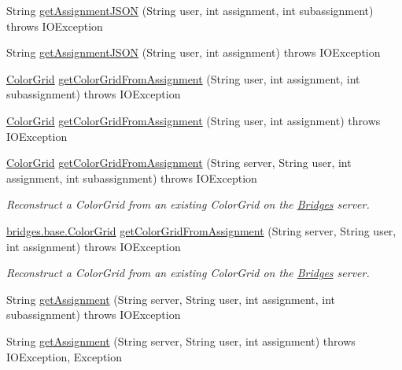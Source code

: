 \begin{DoxyCompactItemize}
String \hyperlink{classbridges_1_1connect_1_1_data_source_af2f6cd7172acb64b2ba49f134b5391f8}{get\+Assignment\+J\+S\+ON} (String user, int assignment, int subassignment)  throws I\+O\+Exception 
\item 
String \hyperlink{classbridges_1_1connect_1_1_data_source_af55c85da71b588f64ff4b46dbacab7f4}{get\+Assignment\+J\+S\+ON} (String user, int assignment)  throws I\+O\+Exception 
\item 
\hyperlink{classbridges_1_1base_1_1_color_grid}{Color\+Grid} \hyperlink{classbridges_1_1connect_1_1_data_source_a7bddb93c9196a1109f2bf36054500ed8}{get\+Color\+Grid\+From\+Assignment} (String user, int assignment, int subassignment)  throws I\+O\+Exception 
\item 
\hyperlink{classbridges_1_1base_1_1_color_grid}{Color\+Grid} \hyperlink{classbridges_1_1connect_1_1_data_source_a19356653cc7ae56f57f5d28994048ee3}{get\+Color\+Grid\+From\+Assignment} (String user, int assignment)  throws I\+O\+Exception 
\item 
\hyperlink{classbridges_1_1base_1_1_color_grid}{Color\+Grid} \hyperlink{classbridges_1_1connect_1_1_data_source_a8c2d68431a992a17912ad8c6763a35f2}{get\+Color\+Grid\+From\+Assignment} (String server, String user, int assignment, int subassignment)  throws I\+O\+Exception 
\begin{DoxyCompactList}\small\item\em Reconstruct a Color\+Grid from an existing Color\+Grid on the \hyperlink{classbridges_1_1connect_1_1_bridges}{Bridges} server. \end{DoxyCompactList}\item 
\hyperlink{classbridges_1_1base_1_1_color_grid}{bridges.\+base.\+Color\+Grid} \hyperlink{classbridges_1_1connect_1_1_data_source_a87126978d697cd1787f2477e551680af}{get\+Color\+Grid\+From\+Assignment} (String server, String user, int assignment)  throws I\+O\+Exception 
\begin{DoxyCompactList}\small\item\em Reconstruct a Color\+Grid from an existing Color\+Grid on the \hyperlink{classbridges_1_1connect_1_1_bridges}{Bridges} server. \end{DoxyCompactList}\item 
String \hyperlink{classbridges_1_1connect_1_1_data_source_a5c365c30f2ae0bbcfea90a7351dcf6af}{get\+Assignment} (String server, String user, int assignment, int subassignment)  throws I\+O\+Exception 
\item 
String \hyperlink{classbridges_1_1connect_1_1_data_source_afdd8d0df6dc8d5a5d40b56c3b62c9d86}{get\+Assignment} (String server, String user, int assignment)  throws I\+O\+Exception, Exception 
\end{DoxyCompactItemize}


